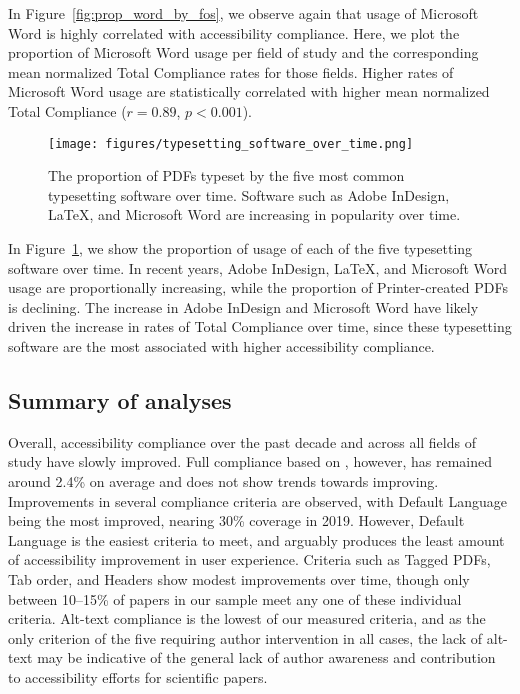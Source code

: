 In Figure~\ref{fig:prop_word_by_fos}, we observe again that usage of Microsoft Word is highly correlated with accessibility compliance. Here, we plot the proportion of Microsoft Word usage per field of study and the corresponding mean normalized Total Compliance rates for those fields. Higher rates of Microsoft Word usage are statistically correlated with higher mean normalized Total Compliance ($r = 0.89$, $p < 0.001$). 

\begin{figure}[t!]
  \centering
    \texttt{[image: figures/typesetting\_software\_over\_time.png]}
  \caption{The proportion of PDFs typeset by the five most common typesetting software over time. Software such as Adobe InDesign, LaTeX, and Microsoft Word are increasing in popularity over time.}
  \label{fig:software_over_time}
\end{figure}

In Figure~\ref{fig:software_over_time}, we show the proportion of usage of each of the five typesetting software over time. In recent years, Adobe InDesign, LaTeX, and Microsoft Word usage are proportionally increasing, while the proportion of Printer-created PDFs is declining. The increase in Adobe InDesign and Microsoft Word have likely driven the increase in rates of Total Compliance over time, since these typesetting software are the most associated with higher accessibility compliance. 


\subsection{Summary of analyses}
\label{sec:sos_summary}

Overall, accessibility compliance over the past decade and across all fields of study have slowly improved. Full compliance based on , however, has remained around 2.4\% on average and does not show trends towards improving. Improvements in several compliance criteria are observed, with Default Language being the most improved, nearing 30\% coverage in 2019. However, Default Language is the easiest criteria to meet, and arguably produces the least amount of accessibility improvement in user experience. Criteria such as Tagged PDFs, Tab order, and Headers show modest improvements over time, though only between 10--15\% of papers in our sample meet any one of these individual criteria. Alt-text compliance is the lowest of our measured criteria, and as the only criterion of the five requiring author intervention in all cases, the lack of alt-text may be indicative of the general lack of author awareness and contribution to accessibility efforts for scientific papers. 

